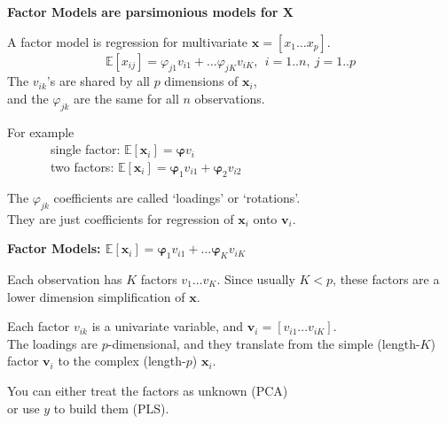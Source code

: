 \documentclass[11pt,xcolor=svgnames]{beamer}
\newcommand{\theme}{\color{Maroon}}
\newcommand{\bk}{\color{black}}
\newcommand{\gr}{\color{black!60}}
\newcommand{\nv}{\color{Navy}}
\newcommand{\bs}[1]{\boldsymbol{#1}}
\newcommand{\bm}[1]{\mathbf{#1}}
\newcommand{\ds}[1]{\mathds{#1}}
\newcommand{\sk}{\vspace{.5cm}}
\begin{document}
\begin{frame}

{\bf \theme Factor Models \bk are parsimonious models for $\bm{X}$}

\sk
A factor model is regression for multivariate $\bm{x} = [x_1
\ldots x_p]$.
\[
\ds{E}[x_{ij}] = \varphi_{j1} v_{i1} + \ldots  \varphi_{jK} v_{iK}, ~~i=1..n,~j=1..p
\]
The $v_{ik}$'s
are shared by all $p$ dimensions of $\bm{x}_i$, \\and the $\varphi_{jk}$
are the same for all $n$ observations.

\sk
 For example\\
~~~~~~~single factor: $\ds{E}[\bm{x}_i] = \bs{\varphi}v_i$\\ 
~~~~~~~two
factors: $\ds{E}[\bm{x}_i] = \bs{\varphi}_1v_{i1} + \bs{\varphi}_2v_{i2}$


\sk
The $\varphi_{jk}$ coefficients are called `{\nv loadings}' or `{\nv rotations}'. \\They are just
coefficients for regression of $\bm{x}_i$ onto $\bm{v}_i$.

\end{frame}

\begin{frame}

{\bf \theme Factor Models: \bk 
$
\ds{E}[\bm{ x}_{i}] = \bs{\varphi}_{1} v_{i1} + \ldots  \bs{\varphi}_{K} v_{iK}$}


\sk\gr
Each observation has $K$ factors $v_1 \ldots v_K$.  \bk
Since usually $K < p$, these factors are a lower dimension
  simplification of $\bm{x}$.

\sk
\gr
Each factor $v_{ik}$ is a univariate variable, and $\bm{v}_i =
[v_{i1} \ldots v_{iK}]$.\\\bk  The loadings
are $p$-dimensional, and they translate from the simple
(length-$K$) factor $\bm{v}_i$ to the complex (length-$p$) $\bm{x}_i$.

\sk
You can either treat the factors as unknown (PCA) \\or use $y$
 to build  them (PLS).
\end{frame}
\end{document}
